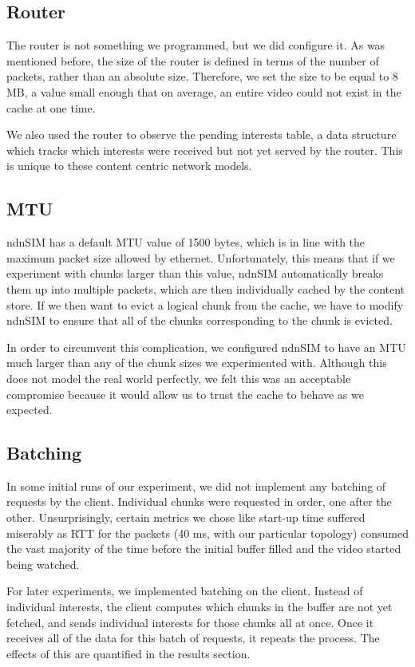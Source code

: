 \subsection{Router} \label{sec:router}

The router is not something we programmed, but we did configure it. As was
mentioned before, the size of the router is defined in terms of the number of
packets, rather than an absolute size. Therefore, we set the size to be equal to
8 MB, a value small enough that on average, an entire video could not exist in
the cache at one time.

We also used the router to observe the pending interests table, a data structure
which tracks which interests were received but not yet served by the router.
This is unique to these content centric network models.

\subsection{MTU} \label{sec:mtu}

ndnSIM has a default MTU value of 1500 bytes, which is in line with the maximum
packet size allowed by ethernet. Unfortunately, this means that if we experiment
with chunks larger than this value, ndnSIM automatically breaks them up into
multiple packets, which are then individually cached by the content store. If we
then want to evict a logical chunk from the cache, we have to modify ndnSIM to
ensure that all of the chunks corresponding to the chunk is evicted. 

In order to circumvent this complication, we configured ndnSIM to have an MTU
much larger than any of the chunk sizes we experimented with. Although this does
not model the real world perfectly, we felt this was an acceptable compromise
because it would allow us to trust the cache to behave as we expected.

\subsection{Batching} \label{sec:batching}

In some initial runs of our experiment, we did not implement any batching of
requests by the client. Individual chunks were requested in order, one after the
other. Unsurprisingly, certain metrics we chose like start-up time suffered
miserably as RTT for the packets (40 ms, with our particular topology) consumed
the vast majority of the time before the initial buffer filled and the video
started being watched.

For later experiments, we implemented batching on the client. Instead of
individual interests, the client computes which chunks in the buffer are not yet
fetched, and sends individual interests for those chunks all at once. Once it
receives all of the data for this batch of requests, it repeats the process. The
effects of this are quantified in the results section.
